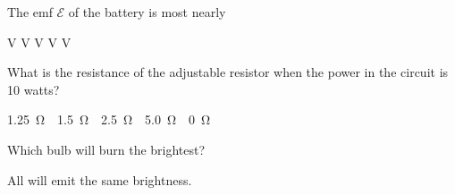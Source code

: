 \documentclass{../../oss-classkick-exam}
\begin{document}
\begin{multicols}{2}
\begin{questions}
    \question The emf $\mathcal E$ of the battery is most nearly
    \label{adjust1}
    \begin{choices}
       V
       V
       V
       V
       V
    \end{choices}
    
    \question What is the resistance of the adjustable resistor when the power
    in the circuit is 10 watts?
    \label{adjust2}
    \begin{choices}
      \choice\SI{1.25}\ohm
      \choice\SI{1.5}\ohm
      \choice\SI{2.5}\ohm
      \choice\SI{5.0}\ohm
      \choice\SI{0}\ohm
    \end{choices}    
    
%
%
    
    \question Which bulb will burn the brightest?
    \label{bulb1}
    \begin{choices}
       \choice All will emit the same brightness.
    \end{choices}
    \vspace{.7in}
    

\end{questions}
\end{multicols}
\end{document}
